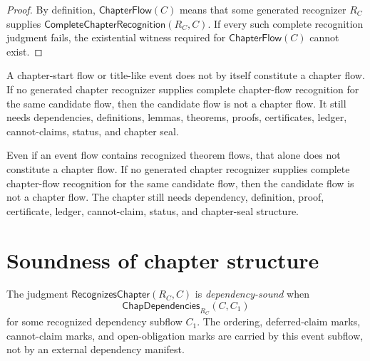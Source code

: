 \begin{proof}
By definition, $\mathsf{ChapterFlow}(C)$ means that some generated recognizer $R_C$ supplies $\mathsf{CompleteChapterRecognition}(R_C,C)$. If every such complete recognition judgment fails, the existential witness required for $\mathsf{ChapterFlow}(C)$ cannot exist.
\end{proof}

\begin{corollary}
\label{cor:chapter-generated-title-alone-not-chapter}
A chapter-start flow or title-like event does not by itself constitute a chapter flow. If no generated chapter recognizer supplies complete chapter-flow recognition for the same candidate flow, then the candidate flow is not a chapter flow. It still needs dependencies, definitions, lemmas, theorems, proofs, certificates, ledger, cannot-claims, status, and chapter seal.
\end{corollary}

\begin{corollary}
\label{cor:chapter-generated-theorem-list-alone-not-chapter}
Even if an event flow contains recognized theorem flows, that alone does not constitute a chapter flow. If no generated chapter recognizer supplies complete chapter-flow recognition for the same candidate flow, then the candidate flow is not a chapter flow. The chapter still needs dependency, definition, proof, certificate, ledger, cannot-claim, status, and chapter-seal structure.
\end{corollary}

\section{Soundness of chapter structure}
\label{sec:chapter-generated-soundness}

\begin{definition}
\label{def:chapter-generated-dependency-sound}
The judgment $\mathsf{RecognizesChapter}(R_C,C)$ is \emph{dependency-sound} when
$$
  \mathsf{ChapDependencies}_{R_C}(C,C_1)
$$
for some recognized dependency subflow $C_1$. The ordering, deferred-claim marks, cannot-claim marks, and open-obligation marks are carried by this event subflow, not by an external dependency manifest.
\end{definition}

